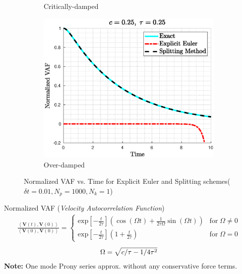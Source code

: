 \documentclass[a4paper,10pt]{beamer}
\newcommand{\BS}[1]{\boldsymbol{#1}}
\newcommand{\sqb}[1]{\left[ #1 \right]}
\newcommand{\rb}[1]{\left( #1 \right)}
\newcommand{\angbrac}[1]{\left \langle #1 \right \rangle}
\begin{document}
\begin{frame}
\begin{figure}[H]
\begin{subfigure}[b]{0.326\linewidth}
				\caption{Critically-damped}
			\end{subfigure}
			\begin{subfigure}[b]{0.326\linewidth}
				\includegraphics[width=\linewidth]{./Plots/CaseStudy/Overdamped.eps}
				\caption{Over-damped}
			\end{subfigure}
			\caption{Normalized VAF vs. Time for Explicit Euler and Splitting schemes($\delta t = 0.01, N_{p} = 1000, N_{k} = 1$)}
		\end{figure}
		\vspace{-0.5cm}
		\begin{alertblock}{Normalized VAF (\textit{Velocity Autocorrelation Function})}
			\begin{align}
				\frac{\angbrac{\BS{V}(t),\BS{V}(0)}}{\angbrac{\BS{V}(0),\BS{V}(0)}} = 
				\begin{cases}
				\text{exp} \sqb{-\frac{t}{2 \tau}} \rb{\cos\rb{\Omega t} + \frac{1}{2\tau\Omega} \sin\rb{\Omega t}}  &\text{for} \; \Omega \neq 0 \\
				\text{exp} \sqb{-\frac{t}{2 \tau}} \rb{1 + \frac{t}{2 \tau}} &\text{for} \; \Omega = 0
				\end{cases}
				\label{eq:oneModeExactVAF}
			\end{align}
			\begin{gather}
				\notag
				\Omega = \sqrt{c/\tau - 1/4\tau^{2}}
			\end{gather}
			\textbf{Note:} One mode Prony series approx. without any conservative force terms.
		\end{alertblock}
	\end{frame}
\end{document}
